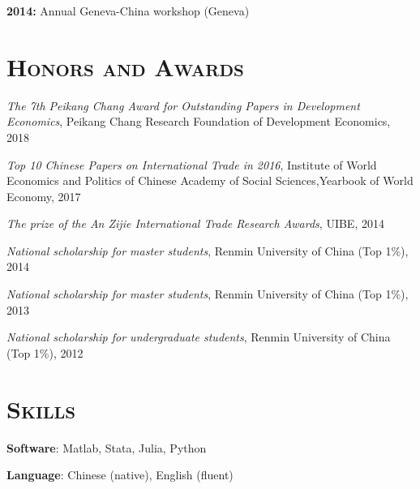 \documentclass[letterpaper]{article}
\begin{document}
\textbf{2014:} Annual Geneva-China workshop (Geneva)

 
\section*{\textsc{Honors and Awards}}

\textit{The 7th Peikang Chang Award for Outstanding Papers in Development Economics}, Peikang Chang Research Foundation of Development Economics, 2018

\textit{Top 10 Chinese Papers on International Trade in 2016}, Institute of World Economics and Politics of Chinese Academy of Social Sciences,Yearbook of World Economy, 2017 

\textit{The  prize of the  An Zijie International Trade Research Awards}, UIBE, 2014

\textit{National scholarship for master students}, Renmin University of China (Top 1\%), 2014

\textit{National scholarship for master students}, Renmin University of China (Top 1\%), 2013

\textit{National scholarship for undergraduate students}, Renmin University of China (Top 1\%), 2012

\section*{\textsc{Skills}}
\textbf{Software}: Matlab, Stata, Julia, Python

\textbf{Language}: Chinese (native), English (fluent)
\end{document}

